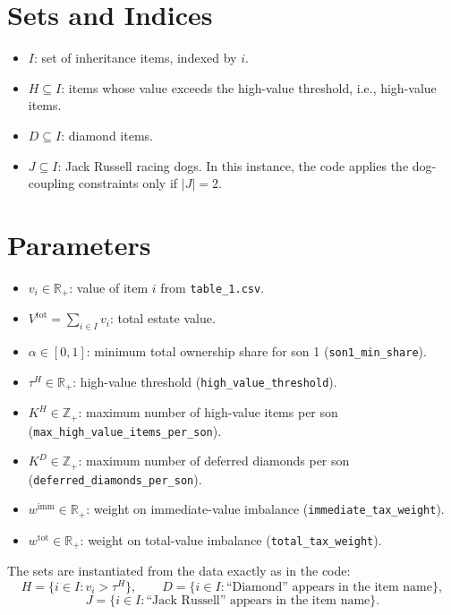 \section*{Sets and Indices}

\begin{itemize}
\item $I$: set of inheritance items, indexed by $i$.
\item $H \subseteq I$: items whose value exceeds the high-value threshold, i.e., high-value items.
\item $D \subseteq I$: diamond items.
\item $J \subseteq I$: Jack Russell racing dogs. In this instance, the code applies the dog-coupling constraints only if $|J|=2$.
\end{itemize}

\section*{Parameters}

\begin{itemize}
\item $v_i \in \mathbb{R}_{+}$: value of item $i$ from \texttt{table\_1.csv}.
\item $V^{\mathrm{tot}}=\sum_{i\in I} v_i$: total estate value.
\item $\alpha \in [0,1]$: minimum total ownership share for son 1 (\texttt{son1\_min\_share}).
\item $\tau^{H} \in \mathbb{R}_{+}$: high-value threshold (\texttt{high\_value\_threshold}).
\item $K^{H}\in \mathbb{Z}_{+}$: maximum number of high-value items per son (\texttt{max\_high\_value\_items\_per\_son}).
\item $K^{D}\in \mathbb{Z}_{+}$: maximum number of deferred diamonds per son (\texttt{deferred\_diamonds\_per\_son}).
\item $w^{\mathrm{imm}}\in \mathbb{R}_{+}$: weight on immediate-value imbalance (\texttt{immediate\_tax\_weight}).
\item $w^{\mathrm{tot}}\in \mathbb{R}_{+}$: weight on total-value imbalance (\texttt{total\_tax\_weight}).
\end{itemize}

The sets are instantiated from the data exactly as in the code:
\[
H=\{i\in I: v_i>\tau^{H}\},\qquad
D=\{i\in I: \text{``Diamond'' appears in the item name}\},
\]
\[
J=\{i\in I: \text{``Jack Russell'' appears in the item name}\}.
\]

